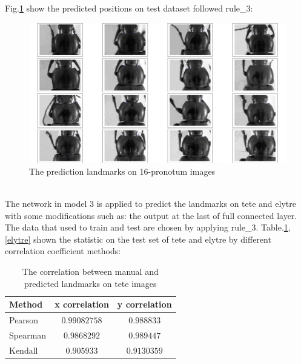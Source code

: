 \documentclass[12pt,a4paper]{article}
\begin{document}
Fig.\ref{cnn3t} show the predicted positions on test dataset followed rule\_3:
\begin{figure}[h!]
	\centering
	\includegraphics[scale=0.2]{images/figure_1_cnn3_5000_v13}
	\caption{The prediction landmarks on 16-pronotum images}
	\label{cnn3t}
\end{figure}~\\[2cm]
The network in model 3 is applied to predict the landmarks on tete and elytre with some modifications such as: the output at the last of full connected layer. The data that used to train and test are chosen by applying rule\_3. Table.\ref{tete},\ref{elytre} shown the statistic on the test set of tete and elytre by different correlation coefficient methods:
\begin{table}[h!]
	\centering
	\begin{tabular}{l c c}
		Method & x correlation & y correlation \\ \hline
		Pearson & $0.99082758$ & $0.988833$ \\ \hline
		Spearman & $0.9868292$ & $0.989447$ \\ \hline
		Kendall & $0.905933$ & $0.9130359$ \\ \hline
	\end{tabular}
	\caption{The correlation between manual and predicted landmarks on tete images}
	\label{tete}
\end{table}
\end{document}
